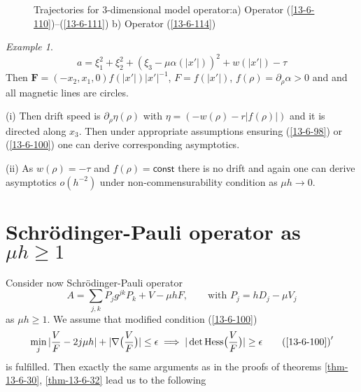 \documentclass[12pt,oneside,openany,article]{memoir}
\numberwithin{equation}{chapter}
\theoremstyle{plain}
\theoremstyle{definition}
\theoremstyle{remark}
\newtheorem{example}[theorem]{Example}
\numberwithin{equation}{chapter}
\begin{document}
\begin{figure}[h]
\centering
{} \qquad
{}
\caption{\label{weird} Trajectories for $3$-dimensional model operator:\newline a) Operator (\ref{13-6-110})--(\ref{13-6-111}) b) Operator (\ref{13-6-114})}
\end{figure}

\begin{example}\label{ex-13-6-36}
\begin{equation}
a= \xi_1^2+\xi_2^2 + (\xi_3 -\mu \alpha (|x'|))^2 +w(|x'|)-\tau
\label{13-6-114}
\end{equation}
Then $\mathbf{F}=(-x_2,x_1,0)f(|x'|)|x'|^{-1}$, $F=f(|x'|)$, $f(\rho) =\partial_\rho \alpha >0$ and and all magnetic lines are circles.

\medskip\noindent
(i) Then drift speed is $\partial_{\rho}\eta(\rho) $ with
$\eta = (-w(\rho) -r |f(\rho)|)$ and it is directed along $x_3$. Then under appropriate assumptions ensuring (\ref{13-6-98}) or (\ref{13-6-100}) one can derive corresponding asymptotics.

\medskip\noindent
(ii) As $w(\rho)=-\tau$ and $f(\rho)={{\mathsf{const}}}$ there is no drift and again one can derive asymptotics $o(h^{-2})$ under non-commensurability condition as 
$\mu h\to 0$.
\end{example}

\section{Schr\"odinger-Pauli operator as $\mu h\ge 1$}
\label{sect-13-6-3-3}

Consider now Schr\"odinger-Pauli operator 
\begin{equation}
A=\sum_{j,k} P_jg^{jk}P_k+V-\mu h F,\qquad \text{with\ \ } P_j=hD_j-\mu V_j
\label{13-5-3}
\end{equation}
as $\mu h\ge 1$. We assume that modified condition (\ref{13-6-100})
\begin{equation}
\min_j |\frac{V}{F} -2j\mu h|+ |\nabla \bigl(\frac{V}{F}\bigr)|\le \epsilon \implies
|\det {\operatorname{Hess}} \bigl(\frac{V}{F}\bigr)|\ge \epsilon
\tag*{$\textup{(\ref*{13-6-100})}'$}\label{13-6-100-'}
\end{equation}
is fulfilled. Then exactly the same arguments as in the proofs of theorems \ref{thm-13-6-30}, \ref{thm-13-6-32} lead us to the following 
\end{document}
